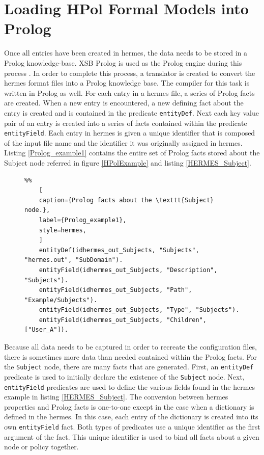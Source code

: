 \documentclass[12pt,letterpaper]{report}
\begin{document}
\section{Loading HPol Formal Models into Prolog}
Once all entries have been created in \ac{hermes}, the data needs to be stored in a Prolog knowledge-base. XSB Prolog is used as the Prolog engine during this process \cite{XSB}. In order to complete this process, a translator is created to convert the \ac{hermes} format files into a Prolog knowledge base. The compiler for this task is written in Prolog as well. For each entry in a \ac{hermes} file, a series of Prolog facts are created. When a new entry is encountered, a new defining fact about the entry is created and is contained in the predicate \texttt{entityDef}. Next each key value pair of an entry is created into a series of facts contained within the predicate \texttt{entityField}. Each entry in \ac{hermes} is given a unique identifier that is composed of the input file name and the identifier it was originally assigned in \ac{hermes}. Listing \ref{Prolog_example1} contains the entire set of Prolog facts stored about the Subject node referred in figure \ref{HPolExample} and listing \ref{HERMES_Subject}.

\begin{figure}
	\begin{lstlisting}%%
	[
	caption={Prolog facts about the \texttt{Subject} node.},
	label={Prolog_example1},
	style=hermes,
	]
	entityDef(idhermes_out_Subjects, "Subjects", "hermes.out", "SubDomain").
	entityField(idhermes_out_Subjects, "Description", "Subjects").
	entityField(idhermes_out_Subjects, "Path", "Example/Subjects").
	entityField(idhermes_out_Subjects, "Type", "Subjects").
	entityField(idhermes_out_Subjects, "Children", ["User_A"]).
	\end{lstlisting}
\end{figure}

Because all data needs to be captured in order to recreate the configuration files, there is sometimes more data than needed contained within the Prolog facts. For the \texttt{Subject} node, there are many facts that are generated. First, an \texttt{entityDef} predicate is used to initially declare the existence of the \texttt{Subject} node. Next, \texttt{entityField} predicates are used to define the various fields found in the \ac{hermes} example in listing \ref{HERMES_Subject}. The conversion between \ac{hermes} properties and Prolog facts is one-to-one except in the case when a dictionary is defined in the \ac{hermes}. In this case, each entry of the dictionary is created into its own \texttt{entityField} fact. Both types of predicates use a unique identifier as the first argument of the fact. This unique identifier is used to bind all facts about a given node or policy together.
\end{document}
